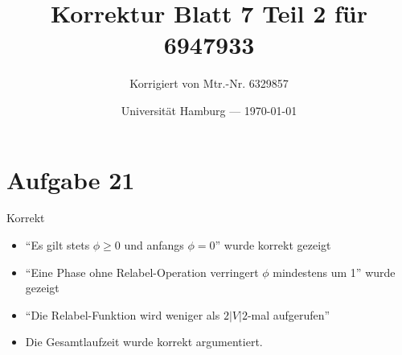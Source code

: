 \documentclass[parskip=half,a4paper]{scrartcl}
\title{Korrektur Blatt 7 Teil 2 für 6947933}
\author{Korrigiert von Mtr.-Nr. 6329857}
\date{Universität Hamburg --- \today}
\begin{document}
\maketitle %

\section{Aufgabe 21}

Korrekt

\begin{itemize}
    \item \enquote{Es gilt stets $\phi \ge 0$ und anfangs $\phi=0$} wurde korrekt gezeigt
    \item \enquote{Eine Phase ohne Relabel-Operation verringert $\phi$ mindestens um 1} wurde gezeigt
    \item \enquote{Die Relabel-Funktion wird weniger als $2|V|2$-mal aufgerufen}
    \item Die Gesamtlaufzeit wurde korrekt argumentiert.
\end{itemize}
\end{document}
